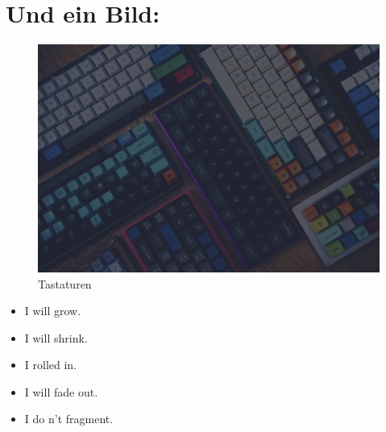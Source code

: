 \documentclass{article}
\begin{document}
\section*{Und ein Bild:}
\label{sec:org2e24d0e}
\begin{figure}[htbp]
\centering
\includegraphics[width=.9\linewidth]{./tastatur.jpg}
\caption{\label{fig:org19ca05e}Tastaturen}
\end{figure}

\begin{itemize}
\item I will grow.
\item I will shrink.
\item I rolled in.
\item I will fade out.
\item I do n't fragment.
\end{itemize}
\end{document}
